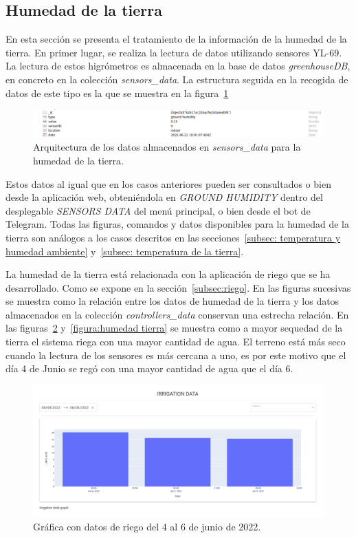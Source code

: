 \documentclass[a4paper, 12pt, oneside]{book}
\begin{document}
\subsection{Humedad de la tierra}
\label{subsec: humedad de la tierra}
En esta sección se presenta el tratamiento de la información de la humedad de la tierra. En primer lugar, se realiza la lectura de datos utilizando sensores YL-69. La lectura de estos higrómetros es almacenada en la base de datos \textit{greenhouseDB}, en concreto en la colección \textit{sensors\_data}. La estructura seguida en la recogida de datos de este tipo es la que se muestra en la figura~\ref{figura:arquitectura_humedad_tierra}

\begin{figure}[H]
	\centering
    \includegraphics[width=12cm, keepaspectratio]{img/arquitectura_humedad_tierra}
    \caption{Arquitectura de los datos almacenados en \textit{sensors\_data} para la humedad de la tierra.}
    \label{figura:arquitectura_humedad_tierra}
\end{figure}

Estos datos al igual que en los casos anteriores pueden ser consultados o bien desde la aplicación web, obteniéndola en \textit{GROUND HUMIDITY} dentro del desplegable \textit{SENSORS DATA} del menú principal, o bien desde el bot de Telegram. Todas las figuras, comandos y datos disponibles para la humedad de la tierra son análogos a los casos descritos en las secciones~\ref{subsec: temperatura y humedad ambiente} y~\ref{subsec: temperatura de la tierra}.

La humedad de la tierra está relacionada con la aplicación de riego que se ha desarrollado. Como se expone en la sección~\ref{subsec:riego}. En las figuras sucesivas se muestra como la relación entre los datos de humedad de la tierra y los datos almacenados en la colección \textit{controllers\_data} conservan una estrecha relación.
En las figuras~\ref{figura:figura riego} y~\ref{figura:humedad tierra} se muestra como a mayor sequedad de la tierra el sistema riega con una mayor cantidad de agua. El terreno está más seco cuando la lectura de los sensores es más cercana a uno, es por este motivo que el día 4 de Junio se regó con una mayor cantidad de agua que el día 6.

\begin{figure}[H]
	\centering
    \includegraphics[width=12cm, keepaspectratio]{img/figura_riego}
    \caption{Gráfica con datos de riego del 4 al 6 de junio de 2022.}
    \label{figura:figura riego}
\end{figure}
\end{document}
